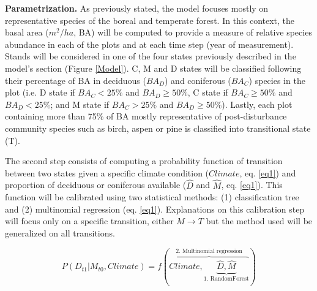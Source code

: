 \textbf{Parametrization.} As previously stated, the model focuses mostly on
representative species of the boreal and temperate forest. In this context,
the basal area ($m^2/ha$, BA) will be computed to provide a measure of relative
species abundance in each of the plots and at each time step (year of
measurement). Stands will be considered in one of the four states previously
described in the model's section (Figure \ref{Model}). C, M and D states will be
classified following their percentage of BA in deciduous ($BA_D$) and coniferous
($BA_C$) species in the plot (i.e. D state if $BA_C < 25\%$ and $BA_D \geq
50\%$, C state if ${BA}_C \geq 50\%$ and $BA_D < 25\%$; and M state if $BA_C >
25\%$ and $BA_D \geq 50\%$). Lastly, each plot containing more than 75\% of BA
mostly representative of post-disturbance community species such as birch,
aspen or pine is classified into transitional state (T). 
%
%
%


The second step
consists of computing a probability function of transition between two states
given a specific climate condition ($Climate$, eq. \ref{eq1}) and proportion
of deciduous or coniferous available ($\hat{D}$ and $\hat{M}$, eq.
\ref{eq1}). This function will be calibrated using two statistical methods:
(1) classification tree and (2) multinomial regression (eq. \ref{eq1}).
Explanations on this calibration step will focus only on a specific
transition, either $M \rightarrow T$ but the method used will be generalized
on all transitions.

\begin{equation}
	P(D_{t1}|M_{t0}, Climate) = f(\overbrace{Climate, \underbrace{\hat{D}, \hat{M}}_\text{1. RandomForest}}^\text{2. Multinomial regression})
\label{eq1}
\end{equation}

